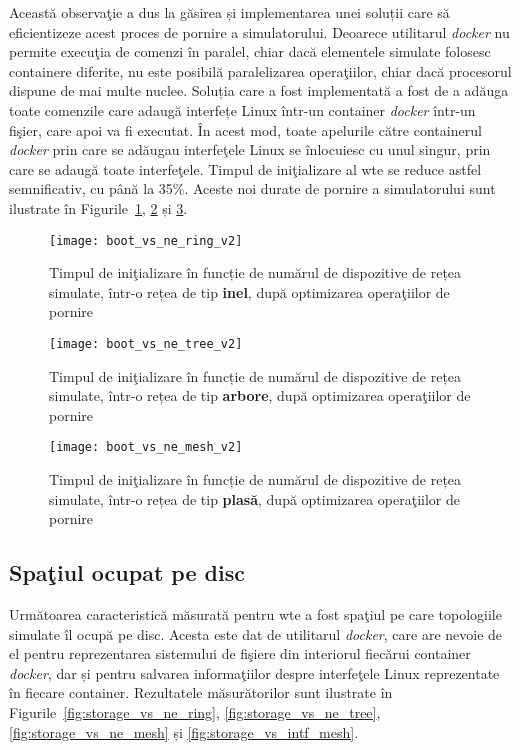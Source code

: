 Această observaţie a dus la găsirea și implementarea unei soluții care să eficientizeze acest proces de pornire a simulatorului. Deoarece utilitarul \textit{docker} nu permite execuţia de comenzi în paralel, chiar dacă elementele simulate folosesc containere diferite, nu este posibilă paralelizarea operaţiilor, chiar dacă procesorul dispune de mai multe nuclee. Soluția care a fost implementată a fost de a adăuga toate comenzile care adaugă interfețe Linux într-un container \textit{docker} într-un fişier, care apoi va fi executat. În acest mod, toate apelurile către containerul \textit{docker} prin care se adăugau interfeţele Linux se înlocuiesc cu unul singur, prin care se adaugă toate interfeţele. Timpul de iniţializare al \gls{wte} se reduce astfel semnificativ, cu până la 35\%. Aceste noi durate de pornire a simulatorului sunt ilustrate în Figurile~\ref{fig:boot_vs_ne_ring_v2}, \ref{fig:boot_vs_ne_tree_v2} și \ref{fig:boot_vs_ne_mesh_v2}.

\begin{figure}[hp]
	\centering
	\texttt{[image: boot\_vs\_ne\_ring\_v2]}
	\caption{Timpul de iniţializare în funcție de numărul de dispozitive de rețea simulate, într-o rețea de tip \textbf{inel}, după optimizarea operaţiilor de pornire}
	\label{fig:boot_vs_ne_ring_v2}
\end{figure}

\begin{figure}[hp]
	\centering
	\texttt{[image: boot\_vs\_ne\_tree\_v2]}
	\caption{Timpul de iniţializare în funcție de numărul de dispozitive de rețea simulate, într-o rețea de tip \textbf{arbore}, după optimizarea operaţiilor de pornire}
	\label{fig:boot_vs_ne_tree_v2}
\end{figure}

\begin{figure}[hp]
	\centering
	\texttt{[image: boot\_vs\_ne\_mesh\_v2]}
	\caption{Timpul de iniţializare în funcție de numărul de dispozitive de rețea simulate, într-o rețea de tip \textbf{plasă}, după optimizarea operaţiilor de pornire}
	\label{fig:boot_vs_ne_mesh_v2}
\end{figure}

\subsection{Spaţiul ocupat pe disc}

Următoarea caracteristică măsurată pentru \gls{wte} a fost spaţiul pe care topologiile simulate îl ocupă pe disc. Acesta este dat de utilitarul \textit{docker}, care are nevoie de el pentru reprezentarea sistemului de fişiere din interiorul fiecărui container \textit{docker}, dar și pentru salvarea informaţiilor despre interfeţele Linux reprezentate în fiecare container. Rezultatele măsurătorilor sunt ilustrate în Figurile~\ref{fig:storage_vs_ne_ring}, \ref{fig:storage_vs_ne_tree}, \ref{fig:storage_vs_ne_mesh} și \ref{fig:storage_vs_intf_mesh}.

